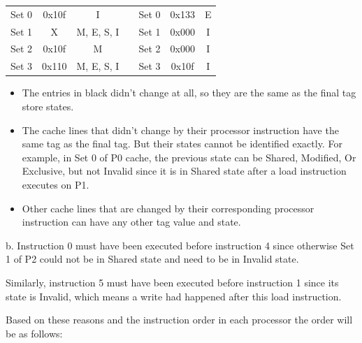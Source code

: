 \documentclass[12pt]{article}
\begin{document}
\begin{table}[H]
\begin{tabular}{ccclccc}
		\multicolumn{1}{|c|}{Set 0} & \multicolumn{1}{c|}{0x10f} & \multicolumn{1}{c|}{I}          & \multicolumn{1}{l|}{} & \multicolumn{1}{c|}{Set 0} & \multicolumn{1}{c|}{0x133} & \multicolumn{1}{c|}{E}          \\ \cline{1-3} \cline{5-7} 
		\multicolumn{1}{|c|}{Set 1} & \multicolumn{1}{c|}{X}     & \multicolumn{1}{c|}{M, E, S, I} & \multicolumn{1}{l|}{} & \multicolumn{1}{c|}{Set 1} & \multicolumn{1}{c|}{0x000} & \multicolumn{1}{c|}{I}          \\ \cline{1-3} \cline{5-7} 
		\multicolumn{1}{|c|}{Set 2} & \multicolumn{1}{c|}{0x10f} & \multicolumn{1}{c|}{M}          & \multicolumn{1}{l|}{} & \multicolumn{1}{c|}{Set 2} & \multicolumn{1}{c|}{0x000} & \multicolumn{1}{c|}{I}          \\ \cline{1-3} \cline{5-7} 
		\multicolumn{1}{|c|}{Set 3} & \multicolumn{1}{c|}{0x110} & \multicolumn{1}{c|}{M, E, S, I} & \multicolumn{1}{l|}{} & \multicolumn{1}{c|}{Set 3} & \multicolumn{1}{c|}{0x10f} & \multicolumn{1}{c|}{I}          \\ \cline{1-3} \cline{5-7} 
	\end{tabular}
\end{table}

\begin{itemize}
	\item The entries in black didn't change at all, so they are the same as the final tag store states.
	
	\item The cache lines that didn't change by their processor instruction have the same tag as the final tag. But their states cannot be identified exactly. For example, in Set 0 of P0 cache, the previous state can be Shared, Modified, Or Exclusive, but not Invalid since it is in Shared state after a load instruction executes on P1. 
	
	\item Other cache lines that are changed by their corresponding processor instruction can have any other tag value and state.
\end{itemize}


b. Instruction 0 must have been executed before instruction 4 since otherwise Set 1 of P2 could not be in Shared state and need to be in Invalid state.

Similarly, instruction 5 must have been executed before instruction 1 since its state is Invalid, which means a write had happened after this load instruction.

Based on these reasons and the instruction order in each processor the order will be as follows:
\end{document}
